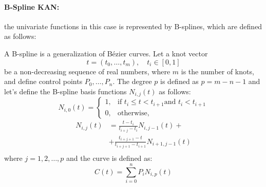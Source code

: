 \documentclass[11pt,a4paper,twocolumn]{article}
\begin{document}
    \paragraph{B-Spline KAN:} 
        the univariate functions in this case is represented by B-splines, which are defined as follows:
        \begin{theorem}
            \label{def:B-spline}
            A B-spline is a generalization of Bézier curves. Let a knot vector 
            \begin{equation}
                \label{eq:knot_vector}
                t = (t_0, \dots, t_m), \quad t_i \in [0,1]
            \end{equation}
            be a non-decreasing sequence of real numbers, where $m$ is the number of knots, and define control points $P_0, \dots, P_n$.
            The degree $p$ is defined as $p = m - n - 1$ and let's define the B-spline basis functions $N_{i,j}(t)$ as follows:
            \begin{equation}
                \label{eq:B-spline_basis_0}
                N_{i,0}(t) = \begin{cases}
                1, & \text{if } t_i \leq t < t_{i+1} \text{and } t_i<t_{i+1}  \\
                0, & \text{otherwise}, 
                \end{cases}
            \end{equation}
            \begin{equation}
                \label{eq:B-spline_basis_ij}
                \begin{split}
                N_{i,j}(t) &= \frac{t - t_i}{t_{i+j} - t_i} N_{i,j-1}(t) + \\
                            &+ \frac{t_{i+j+1} - t}{t_{i+j+1} - t_{i+1}} N_{i+1,j-1}(t) \\
                \end{split}
            \end{equation}
            where $j = 1,2, \dots, p$ and the curve is defined as:
            \begin{equation}
                \label{eq:B-spline_curve}
                C(t) = \sum_{i=0}^{n} P_i N_{i,p}(t)
            \end{equation}
        \end{theorem}
\end{document}
